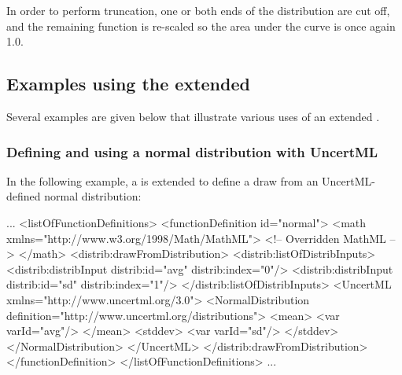 \documentclass[draftspec]{sbmlpkgspec}
\begin{document}
In order to perform truncation, one or both ends of the distribution are cut off, and the remaining function is re-scaled so the area under the curve is once again 1.0.  


\subsection{Examples using the extended \FunctionDefinition}
\label{sec:fd-examples}

Several examples are given below that illustrate various uses of an extended \FunctionDefinition.

\subsubsection{Defining and using a normal distribution with UncertML}
In the following example, a \FunctionDefinition is extended to define a draw from an UncertML-defined normal distribution:

\begin{example}
...
  <listOfFunctionDefinitions>
    <functionDefinition id="normal">
      <math xmlns="http://www.w3.org/1998/Math/MathML">
        <!-- Overridden MathML -->
      </math>
      <distrib:drawFromDistribution>
         <distrib:listOfDistribInputs>
           <distrib:distribInput distrib:id="avg" distrib:index="0"/>
           <distrib:distribInput distrib:id="sd" distrib:index="1"/>
         </distrib:listOfDistribInputs>
         <UncertML xmlns="http://www.uncertml.org/3.0">
           <NormalDistribution definition="http://www.uncertml.org/distributions">
             <mean>
               <var varId="avg"/>
             </mean>
             <stddev>
               <var varId="sd"/>
             </stddev>
           </NormalDistribution>
         </UncertML>
      </distrib:drawFromDistribution>
    </functionDefinition>
  </listOfFunctionDefinitions>
...
\end{example}
\end{document}
